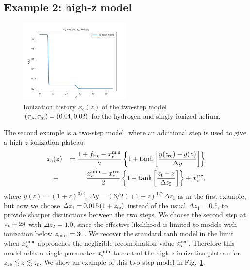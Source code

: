 \documentclass[prd,twocolumn,amsmath,amssymb,floatfix,superscriptaddress,nofootinbib]{revtex4-1}
\newcommand{\zmax}{z_{\rm max}}
\newcommand{\xemin}{x_e^{\rm min}}
\newcommand{\tauhi}{\tau_{\rm hi}}
\newcommand{\taulo}{\tau_{\rm lo}}
\newcommand{\bea}{\begin{eqnarray}}
\newcommand{\eea}{\end{eqnarray}}
\begin{document}
 

\subsection{Example 2: high-z model}
\label{sec:example2}


\begin{figure}
\includegraphics[width=0.5\textwidth]{results/cosmomc_kde/taulo_prior_test/plot_xez_taulo_0p04_tauhi_0p02.png}
\caption{Ionization history $x_e(z)$ of the two-step model $(\taulo, \tauhi) = (0.04, 0.02)$ for the hydrogen and singly ionized helium.
}
\label{fig:two_step_model}
\end{figure}
 
 
The second example is a two-step model, where an additional step is used to give a high-$z$ ionization plateau: 
 \bea
x_e&(z)&\,= \frac{1+f_{\rm He} - \xemin}{2}\left\{  1+ \tanh\left[ \frac{y(z_{\rm re})-y(z)}{\Delta y} \right] \right\} \notag \\
&+& \frac{\xemin - x_e^{\rm rec}}{2}\left\{  1+ \tanh\left[ \frac{z_{\rm t}-z}{\Delta z_{2}} \right] \right\} + x_e^{\rm rec},
 \label{eqn:tanh_highz}
 \eea
where $y(z)=(1+z)^{3/2}$, $\Delta y=(3/2)(1+z)^{1/2}\Delta z_1$ as in the first example, but now we choose $\Delta z_1 = 0.015\, (1+z_{\rm re})$ instead of the usual $\Delta z_1 = 0.5$, to provide sharper distinctions between the two steps.
We choose the second step at $z_{\rm t}=28$ with $\Delta z_2 = 1.0$, since the effective likelihood is limited to models with ionization below $\zmax=30$. 
We recover the standard tanh model in the limit when $\xemin$ approaches the negligible recombination value $x_e^{\rm rec}$.
Therefore this model adds a single parameter $\xemin$ to control the high-$z$ ionization plateau for $z_{\rm re} \lesssim z \lesssim z_t$. We show an example
of this two-step model in Fig.~\ref{fig:two_step_model}.
\end{document}
